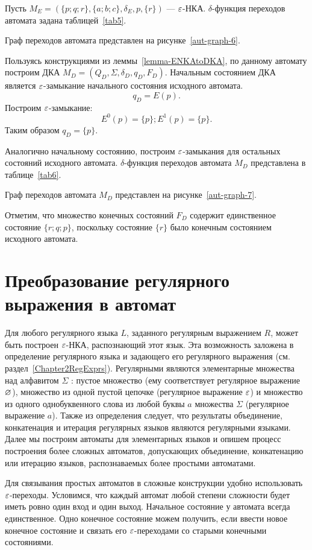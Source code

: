 \begin{myexample}
\label{example-reduceENKAtoDKA}
Пусть $M_E = (\{ p; q; r \},\{ a; b; c \}, \delta_E, p, \{ r \})$ --- $\varepsilon$-НКА. $\delta$-функция переходов автомата задана таблицей~\ref{tab5}. 

Граф переходов автомата представлен на рисунке~\ref{aut-graph-6}.

Пользуясь конструкциями из леммы~\ref{lemma-ENKAtoDKA}, по данному автомату построим ДКА $M_D = (Q_D, \Sigma, \delta_D, q_D, F_D)$.
Начальным состоянием ДКА является $\varepsilon$-замыкание начального состояния исходного автомата.
\[
	q_D = E(p).
\]
Построим $\varepsilon$-замыкание:
\[
	E^0(p) = \{ p \};
	E^1(p) = \{ p \}.
\]
Таким образом $q_D = \{ p \}$.

Аналогично начальному состоянию, построим $\varepsilon$-замыкания для остальных состояний исходного автомата. $\delta$-функция переходов автомата $M_D$ представлена в таблице~\ref{tab6}.

Граф переходов автомата $M_D$  представлен на рисунке~\ref{aut-graph-7}.

Отметим, что множество конечных состояний $F_D$ содержит единственное состояние $\{ r; q; p \}$, поскольку состояние $\{ r \}$ было конечным состоянием исходного автомата.
\end{myexample}

\section{Преобразование регулярного выражения в автомат}
\label{Chapter4RegtoFA}
Для любого регулярного языка $L$, заданного регулярным выражением $R$, может быть построен $\varepsilon$-НКА, распознающий этот язык. Эта возможность заложена в определение регулярного языка и задающего его регулярного выражения (см. раздел~\ref{Chapter2RegExprs}). Регулярными являются элементарные множества над алфавитом $\Sigma$ : пустое множество (ему соответствует регулярное выражение $\varnothing$), множество из одной пустой цепочке (регулярное выражение $\varepsilon$) и множество из одного однобуквенного слова из любой буквы $a$ множества $\Sigma$ (регулярное выражение $a$). Также из определения следует, что результаты объединение, конкатенация и итерация регулярных языков являются регулярными языками. Далее мы построим автоматы для элементарных языков и опишем процесс построения более сложных автоматов, допускающих объединение, конкатенацию или итерацию языков, распознаваемых более простыми автоматами.

Для связывания простых автоматов в сложные конструкции удобно использовать $\varepsilon$-переходы. Условимся, что каждый автомат любой степени сложности будет иметь ровно один вход и один выход. Начальное состояние у автомата всегда единственное. Одно конечное состояние можем получить, если ввести новое конечное состояние и связать его $\varepsilon$-переходами со старыми конечными состояниями.

